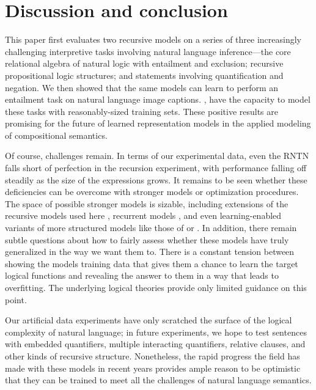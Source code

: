 \section{Discussion and conclusion}\label{sec:discussion}

This paper first evaluates two recursive models on a series of three increasingly
challenging interpretive tasks involving natural language inference---the 
core relational algebra of natural logic with entailment and
exclusion; recursive propositional logic structures; and statements
involving quantification and negation. We then showed that the same models can learn to
perform an entailment task on natural language image captions. , have the capacity to model these tasks with 
reasonably-sized training sets. These positive results are
promising for the future of learned representation models in the
applied modeling of compositional semantics.

Of course, challenges remain. In terms of our experimental data, even
the RNTN falls short of perfection in the recursion experiment, with
performance falling off steadily as the size of the expressions grows. It
remains to be seen whether these deficiencies can be overcome with
stronger models or optimization procedures. The space of possible stronger
models is sizable, including extensions of the recursive models used here
\cite{sochergrounded,kalchbrenner2014convolutional,irsoydeep}, recurrent
models \cite{sutskever2014sequence}, and even learning-enabled variants 
of more structured models like those of  or .
In addition,
there remain subtle questions about how to fairly assess whether these
models have truly generalized in the way we want them to. There is a
constant tension between showing the models training data that gives
them a chance to learn the target logical functions and revealing the
answer to them in a way that leads to overfitting. The underlying
logical theories provide only limited guidance on this point.

Our artificial data experiments have only scratched the surface 
of the logical complexity of natural language; in future experiments, we hope to test sentences
with embedded quantifiers, multiple interacting quantifiers, relative
clauses, and other kinds of recursive structure. Nonetheless, the
rapid progress the field has made with these models in recent years
provides ample reason to be optimistic that they can be trained to
meet all the challenges of natural language semantics.


